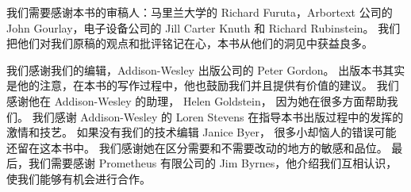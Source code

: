 我们需要感谢本书的审稿人：马里兰大学的 Richard Furuta，Arbortext 公司的 John Gourlay，电子设备公司的 Jill Carter Knuth 和 Richard Rubinstein。
我们把他们对我们原稿的观点和批评铭记在心，本书从他们的洞见中获益良多。



我们感谢我们的编辑，Addison-Wesley 出版公司的 Peter Gordon。
出版本书其实是他的注意，在本书的写作过程中，他也鼓励我们并且提供有价值的建议。
我们感谢他在 Addison-Wesley 的助理， Helen Goldstein， 因为她在很多方面帮助我们。
我们感谢 Addison-Wesley 的 Loren Stevens 在指导本书出版过程中的发挥的激情和技艺。
如果没有我们的技术编辑 Janice Byer， 很多小却恼人的错误可能还留在这本书中。
我们感谢她在区分需要和不需要改动的地方的敏感和品位。
最后，我们需要感谢 Prometheus 有限公司的 Jim Byrnes，他介绍我们互相认识，使我们能够有机会进行合作。
\baselineskip

%


\baselineskip




